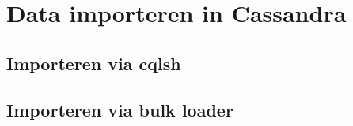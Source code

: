 \chapter{Data importeren in Cassandra}
\label{ch:cassandra_import}

\section{Importeren via cqlsh}

\section{Importeren via bulk loader}